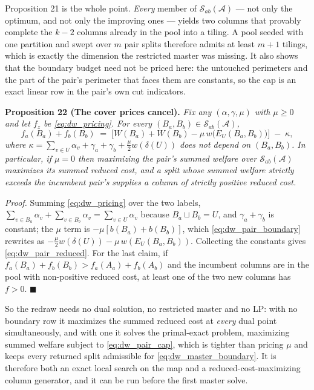 \documentclass{article}
\begin{document}
Proposition 21 is the whole point. \emph{Every} member of
$\mathcal S_{ab}(\mathcal A)$ --- not only the optimum, and not only the
improving ones --- yields two columns that provably complete the $k-2$ columns
already in the pool into a tiling. A pool seeded with one partition and swept
over $m$ pair splits therefore admits at least $m+1$ tilings, which is exactly
the dimension the restricted master was missing. It also shows that the boundary
budget need not be priced here: the untouched perimeters and the part of the
pair's perimeter that faces them are constants, so the cap is an exact linear
row in the pair's own cut indicators.

\noindent\textbf{Proposition 22 (The cover prices cancel).} \textit{Fix any
$(\alpha, \gamma, \mu)$ with $\mu \geq 0$ and let $f_z$ be
\eqref{eq:dw_pricing}. For every $(B_a, B_b) \in \mathcal S_{ab}(\mathcal A)$,}
\begin{equation}\label{eq:dw_pair_reduced}
f_a(B_a) + f_b(B_b) \;=\;
\Big[ W(B_a) + W(B_b) - \mu\, w\big(E_U(B_a,B_b)\big) \Big]
\;-\; \kappa ,
\end{equation}
\textit{where $\kappa = \sum_{v \in U}\alpha_v + \gamma_a + \gamma_b
+ \tfrac{\mu}{2} w(\delta(U))$ does not depend on $(B_a, B_b)$. In particular,
if $\mu = 0$ then maximizing the pair's summed welfare over
$\mathcal S_{ab}(\mathcal A)$ maximizes its summed reduced cost, and a split
whose summed welfare strictly exceeds the incumbent pair's supplies a column of
strictly positive reduced cost.}

\textit{Proof.} Summing \eqref{eq:dw_pricing} over the two labels,
$\sum_{v \in B_a}\alpha_v + \sum_{v \in B_b}\alpha_v = \sum_{v \in U}\alpha_v$
because $B_a \sqcup B_b = U$, and $\gamma_a + \gamma_b$ is constant; the
$\mu$ term is $-\mu[b(B_a) + b(B_b)]$, which \eqref{eq:dw_pair_boundary}
rewrites as $-\tfrac{\mu}{2} w(\delta(U)) - \mu\, w(E_U(B_a,B_b))$. Collecting
the constants gives \eqref{eq:dw_pair_reduced}. For the last claim, if
$f_a(B_a) + f_b(B_b) > f_a(A_a) + f_b(A_b)$ and the incumbent columns are in the
pool with non-positive reduced cost, at least one of the two new columns has
$f > 0$. $\blacksquare$

So the redraw needs no dual solution, no restricted master and no LP: with no
boundary row it maximizes the summed reduced cost at \emph{every} dual point
simultaneously, and with one it solves the primal-exact problem, maximizing
summed welfare subject to \eqref{eq:dw_pair_cap}, which is tighter than pricing
$\mu$ and keeps every returned split admissible for
\eqref{eq:dw_master_boundary}. It is therefore both an exact local search on the
map and a reduced-cost-maximizing column generator, and it can be run before the
first master solve.
\end{document}
